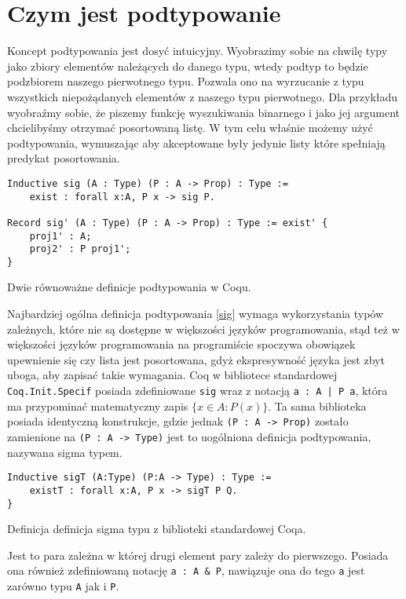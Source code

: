 \section{Czym jest podtypowanie}
Koncept podtypowania jest dosyć intuicyjny. Wyobrazimy sobie na chwilę typy jako zbiory elementów należących do danego typu, wtedy podtyp to będzie podzbiorem naszego pierwotnego typu. Pozwala ono na wyrzucanie z typu wszystkich niepożądanych elementów z naszego typu pierwotnego. Dla przykładu wyobraźmy sobie, że piszemy funkcję wyszukiwania binarnego i jako jej argument chcielibyśmy otrzymać posortowaną listę. W tym celu właśnie możemy użyć podtypowania, wymuszając aby akceptowane były jedynie listy które spełniają predykat posortowania.
\begin{code}
\begin{verbatim}
Inductive sig (A : Type) (P : A -> Prop) : Type :=
    exist : forall x:A, P x -> sig P.
    
Record sig' (A : Type) (P : A -> Prop) : Type := exist' {
    proj1' : A;
    proj2' : P proj1';
}
\end{verbatim}
\caption{Dwie równoważne definicje podtypowania w Coqu.}
\label{sig}
\end{code}
Najbardziej ogólna definicja podtypowania \ref{sig} wymaga wykorzystania typów zależnych, które nie są dostępne w większości języków programowania, stąd też w większości języków programowania na programiście spoczywa obowiązek upewnienie się czy lista jest posortowana, gdyż ekspresywność języka jest zbyt uboga, aby zapisać takie wymagania. Coq w bibliotece standardowej \texttt{Coq.Init.Specif} posiada zdefiniowane \texttt{sig} wraz z notacją \texttt{{a : A | P a}}, która ma przypominać matematyczny zapis $\{x \in A : P(x)\}$. Ta sama biblioteka posiada identyczną konstrukcje, gdzie jednak \texttt{(P : A -> Prop)} zostało zamienione na \texttt{(P : A -> Type)} jest to uogólniona definicja podtypowania, nazywana sigma typem.
\begin{code}
\begin{verbatim}
Inductive sigT (A:Type) (P:A -> Type) : Type :=
    existT : forall x:A, P x -> sigT P Q.
}
\end{verbatim}
\caption{Definicja definicja sigma typu z biblioteki standardowej Coqa.}
\end{code}
Jest to para zależna w której drugi element pary zależy do pierwszego. Posiada ona również zdefiniowaną notację \texttt{{a : A & P}}, nawiązuje ona do tego \texttt{a} jest zarówno typu \texttt{A} jak i \texttt{P}. 
